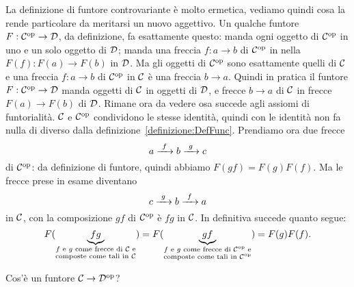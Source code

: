 \begin{nota}
La definizione di funtore controvariante è molto ermetica, vediamo quindi cosa la rende particolare da meritarsi un nuovo aggettivo. Un qualche funtore \(F : \mathcal C^\text{op} \to \mathcal D\), da definizione, fa esattamente questo: manda ogni oggetto di \(\mathcal C^\text{op}\) in uno e un solo oggetto di \(\mathcal D\); manda una freccia \(f : a \to b\) di \(\mathcal C^\text{op}\) in nella \(F(f) : F(a) \to F(b)\) in \(\mathcal D\). Ma gli oggetti di \(\mathcal C^\text{op}\) sono esattamente quelli di \(\mathcal C\) e una freccia \(f : a \to b\) di \(\mathcal C^\text{op}\) in \(\mathcal C\) è una freccia \(b \to a\). Quindi in pratica il funtore \(F : \mathcal C^\text{op} \to \mathcal D\) manda oggetti di \(\mathcal C\) in oggetti di \(\mathcal D\), e frecce \(b \to a\) di \(\mathcal C\) in frecce \(F(a) \to F(b)\) di \(\mathcal D\).\newline
Rimane ora da vedere osa succede agli assiomi di funtorialità. \(\mathcal C\) e \(\mathcal C^\text{op}\) condividono le stesse identità, quindi con le identità non fa nulla di diverso dalla definizione~\ref{definizione:DefFunc}. Prendiamo ora due frecce
\[a \xrightarrow{\ f\ } b \xrightarrow{\ g\ } c\]
di \(\mathcal C^\text{op}\): da definizione di funtore, quindi abbiamo \(F(gf) = F(g) F(f)\). Ma le frecce prese in esame diventano
\[c \xrightarrow{\ g\ } b \xrightarrow{\ f\ } a\]
in \(\mathcal C\), con la composizione \(gf\) di \(\mathcal C^\text{op}\) è \(fg\) in \(\mathcal C\). In definitiva succede quanto segue:
\[F(\underbrace{fg}_{\substack{\text{\(f\) e \(g\) come frecce di \(\mathcal C\) e} \\ \text{composte come tali in \(\mathcal C\)}}}) =
F(\underbrace{gf}_{\substack{\text{\(f\) e \(g\) come frecce di \(\mathcal C^\text{op}\) e} \\ \text{composte come tali in \(\mathcal C^\text{op}\)}}}) =
F(g)F(f).\]
\end{nota}

\begin{esercizio}
Cos'è un funtore \(\mathcal C \to \mathcal D^\text{op}\)?
\end{esercizio}

